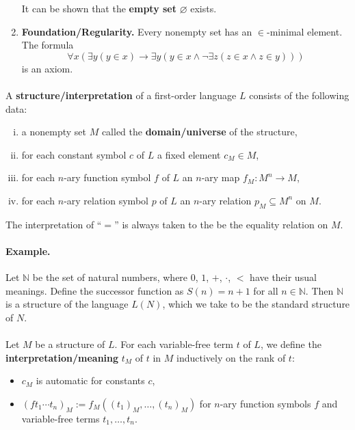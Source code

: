 \documentclass[12pt]{article}
\newlength{\myparskip}
\newenvironment{fullbox}{\begin{lrbox}{\savefullbox}\begin{minipage}{\dimexpr\textwidth-2\fboxsep\relax}\setlength{\parskip}{\myparskip}}{\end{minipage}\end{lrbox}\framebox[\textwidth]{\usebox{\savefullbox}}}
\newenvironment{pbox}[1][]{\begin{fullbox}\def\temp{#1}\ifx\temp\empty\else\paragraph{#1}\phantom{}\fi}{\end{fullbox}}
\theoremstyle{definition}
\newcommand{\N}{\mathbb{N}}
\renewcommand{\emptyset}{\varnothing}
\newcommand{\<}{\langle}
\renewcommand{\>}{\rangle}
\newcommand{\seq}{\subseteq}
\newcommand{\keyword}{\textbf}
\begin{document}
\begin{enumerate}[(1)]
    It can be shown that the \keyword{empty set} $\emptyset$ exists.
    \item \keyword{Foundation/Regularity.} Every nonempty set has an $\in$-minimal element.
    The formula
    \[
        \forall x (\exists y (y \in x) \to \exists y(y \in x \land \lnot\exists z (z \in x \land z \in y)))
    \]
    is an axiom.
\end{enumerate}


\newpage


\begin{pbox}
    A \keyword{structure/interpretation} of a first-order language $L$ consists of the following data:
    \begin{enumerate}[(i)]
        \item a nonempty set $M$ called the \keyword{domain/universe} of the structure,
        \item for each constant symbol $c$ of $L$ a fixed element $c_M \in M$,
        \item for each $n$-ary function symbol $f$ of $L$ an $n$-ary map $f_M : M^n \to M$,
        \item for each $n$-ary relation symbol $p$ of $L$ an $n$-ary relation $p_M \seq M^n$ on $M$.
    \end{enumerate}
    The interpretation of ``$=$'' is always taken to the be the equality relation on $M$.
\end{pbox}



\begin{pbox}[Example.]
    Let $\N$ be the set of natural numbers, where $0$, $1$, $+$, $\cdot$, $<$ have their usual meanings.
    Define the successor function as $S(n) = n + 1$ for all $n \in \N$.
    Then $\N$ is a structure of the language $L(N)$, which we take to be the standard structure of $N$.
\end{pbox}

\begin{pbox}
    Let $M$ be a structure of $L$.
    For each variable-free term $t$ of $L$, we define the \keyword{interpretation/meaning} $t_M$ of $t$ in $M$ inductively on the rank of $t$:
    \begin{itemize}
        \item $c_M$ is automatic for constants $c$,
        \item $(f t_1 \cdots t_n)_M := f_M((t_1)_M, \dots, (t_n)_M)$ for $n$-ary function symbols $f$ and variable-free terms $t_1, \dots, t_n$.
    \end{itemize}
\end{pbox}
\end{document}
